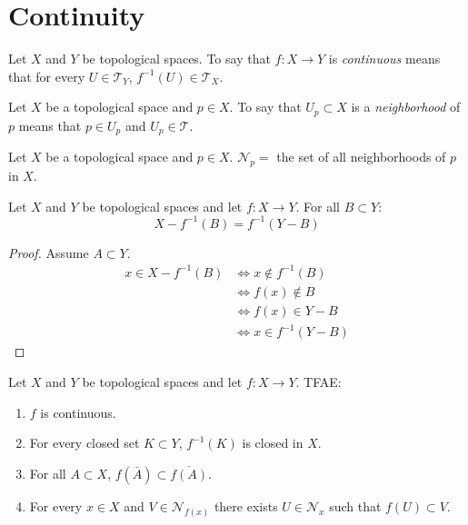 \documentclass[letterpaper,12pt,fleqn]{article}
\newcommand{\T}{\mathscr{T}}
\renewcommand{\N}{\mathcal{N}}
\begin{document}
\section*{Continuity}

\begin{definition}[Continuity]
  Let \(X\) and \(Y\) be topological spaces.  To say that \(f:X\to Y\) is \emph{continuous} means that for every
  \(U\in\T_Y\), \(f^{-1}(U)\in\T_X\).
\end{definition}

\begin{definition}[Neighborhood]
  Let \(X\) be a topological space and \(p\in X\).  To say that \(U_p\subset X\) is a \emph{neighborhood} of \(p\)
  means that \(p\in U_p\) and \(U_p\in\T\).
\end{definition}

\begin{notation}
  Let \(X\) be a topological space and \(p\in X\).  \(\N_p=\) the set of all neighborhoods of \(p\) in \(X\).
\end{notation}

\begin{lemma}
  Let \(X\) and \(Y\) be topological spaces and let \(f:X\to Y\).  For all \(B\subset Y\):
  \[X-f^{-1}(B)=f^{-1}(Y-B)\]
\end{lemma}

\begin{proof}
  Assume \(A\subset Y\).
  \begin{align*}
    x\in X-f^{-1}(B) &\iff x\notin f^{-1}(B) \\
    &\iff f(x)\notin B \\
    &\iff f(x)\in Y-B \\
    &\iff x\in f^{-1}(Y-B)
  \end{align*}
\end{proof}

\begin{theorem}
  Let \(X\) and \(Y\) be topological spaces and let \(f:X\to Y\).  TFAE:
  \begin{enumerate}
  \item \(f\) is continuous.
  \item For every closed set \(K\subset Y\), \(f^{-1}(K)\) is closed in \(X\).
  \item For all \(A\subset X\), \(f(\bar{A})\subset\overline{f(A)}\).
  \item For every \(x\in X\) and \(V\in\N_{f(x)}\) there exists \(U\in\N_x\) such that \(f(U)\subset V\).
  \end{enumerate}
\end{theorem}
\end{document}
